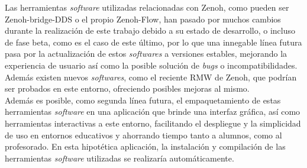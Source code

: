 Las herramientas \textit{software} utilizadas relacionadas con Zenoh, como
pueden ser Zenoh-bridge-DDS o el propio Zenoh-Flow, han pasado por muchos
cambios durante la realización de este trabajo debido a su estado de desarrollo,
o incluso de fase beta, como es el caso de este último, por lo que una innegable
línea futura pasa por la actualización de estos \textit{softwares} a versiones
estables, mejorando la experiencia de usuario así como la posible solución de
\textit{bugs} o incompatibilidades.
Además existen nuevos \textit{softwares}, como el reciente RMW de Zenoh, que
podrían ser probados en este entorno, ofreciendo posibles mejoras al mismo.
\\

Además es posible, como segunda línea futura, el empaquetamiento de estas
herramientas \textit{software} en una aplicación que brinde una interfaz
gráfica, así como herramientas interactivas a este entorno, facilitando el
despliegue y la simplicidad de uso en entornos educativos y ahorrando tiempo
tanto a alumnos, como al profesorado.
En esta hipotética aplicación, la instalación y compilación de las herramientas
\textit{software} utilizadas se realizaría automáticamente.
\\
